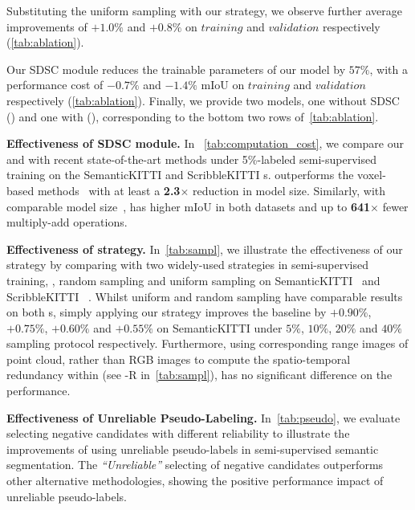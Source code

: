 \documentclass[10pt,twocolumn,letterpaper]{article}
\newcommand\bdtitle[1]{\noindent\textbf{#1}}
\begin{document}
Substituting the uniform sampling with our {\samplshort} strategy, we observe further average improvements of $+1.0\%$ and $+0.8\%$ on $training$ and $validation$ respectively (\cref{tab:ablation}).

Our SDSC module reduces the trainable parameters of our model by $57\%$, with a performance cost of $-0.7\%$ and $-1.4\%$ mIoU on $training$ and $validation$ respectively (\cref{tab:ablation}). Finally, we provide two models, one without SDSC ({\ourmodel}) and one with ({\ourmodelsdsc}), corresponding to the bottom two rows of~\cref{tab:ablation}.

\bdtitle{Effectiveness of SDSC module.} In ~\cref{tab:computation_cost}, we compare our {\ourmodel} and {\ourmodelsdsc} with recent state-of-the-art methods under 5\%-labeled semi-supervised training on the SemanticKITTI and ScribbleKITTI {\validset}s. {\ourmodelsdsc} outperforms the voxel-based methods~\cite{zhu2021cylindrical,Unal_2022_CVPR} with at least a \textbf{2.3}$\times$ reduction in model size. Similarly, with comparable model size~\cite{choy20194d,tang2020searching,yan20222dpass}, {\ourmodelsdsc} has higher mIoU in both datasets and up to \textbf{641}$\times$ fewer multiply-add operations.



\bdtitle{Effectiveness of {\samplshort} strategy.} In~\cref{tab:sampl}, we illustrate the effectiveness of our {\samplshort} strategy by comparing  {\ourmodel} with two widely-used strategies in semi-supervised training, \ie, random sampling and uniform sampling on SemanticKITTI~\cite{behley2019semantickittia} and ScribbleKITTI~\cite{Unal_2022_CVPR} {\validset}. Whilst uniform and random sampling have comparable results on both {\validset}s, simply applying our {\samplshort} strategy improves the baseline by $+0.90\%$, $+0.75\%$, $+0.60\%$ and $+0.55\%$ on SemanticKITTI under $5\%$, $10\%$, $20\%$ and $40\%$ sampling protocol respectively.
Furthermore, using corresponding range images of point cloud, rather than RGB images to compute the spatio-temporal redundancy within {\samplshort} (see {\samplshort}-R in~\cref{tab:sampl}), has no significant difference on the performance.



\bdtitle{Effectiveness of Unreliable Pseudo-Labeling.} In~\cref{tab:pseudo}, we evaluate selecting negative candidates with different reliability to illustrate the improvements of using unreliable pseudo-labels in semi-supervised semantic segmentation. The \textit{“Unreliable”} selecting of negative candidates outperforms other alternative methodologies, showing the positive performance impact of unreliable pseudo-labels.
\end{document}
